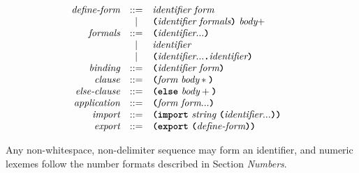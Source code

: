\[\begin{array}{rcll}
\textit{define-form}    & ::= & \textit{identifier} \ \textit{form}                               & \\
                        & |   & \term{(}\textit{identifier} \ \textit{formals}\term{)} \ \textit{body}+ & \\

\textit{formals}        & ::= & \term{(}\textit{identifier}...\term{)}                             & \\
                        & |   & \textit{identifier}                                                 & \\
                        & |   & \term{(}\textit{identifier}... \term{.} \textit{identifier}\term{)} & \\

\textit{binding}        & ::= & \term{(}\textit{identifier} \ \textit{form}\term{)}               & \\

\textit{clause}         & ::= & \term{(}\textit{form} \ \textit{body}*\term{)}                    & \\
\textit{else-clause}    & ::= & \term{(}\term{else} \ \textit{body}+\term{)}                      & \\

\textit{application}    & ::= & \term{(}\textit{form} \ \textit{form}...\term{)}                  & \\

\textit{import}         & ::= & \term{(}\term{import} \ \textit{string} \ \term{(}\textit{identifier}...\term{)}\term{)} & \\
\textit{export}         & ::= & \term{(}\term{export} \ \term{(}\textit{define-form}\term{)}\term{)} & \\

\end{array}\]

Any non-whitespace, non-delimiter sequence may form an identifier, and numeric
lexemes follow the number formats described in Section \emph{Numbers}.
